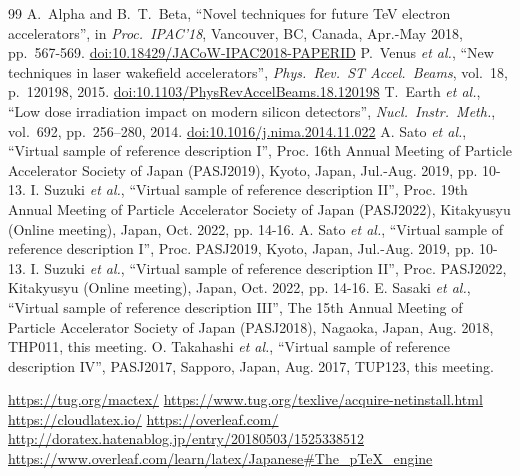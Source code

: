 \documentclass{PASJ2026}
\begin{document}
\begin{thebibliography}{99}
A.~Alpha and B.~T.~Beta, ``Novel techniques for future TeV electron accelerators'',
in \textit{Proc.\ IPAC'18}, 	Vancouver, BC, Canada, Apr.-May 2018,
pp.\ 567-569. %
\url{doi:10.18429/JACoW-IPAC2018-PAPERID}
P.~Venus \emph{et al.},
``New techniques in laser wakefield accelerators'',
\emph{Phys.\ Rev.\ ST Accel.\ Beams}, vol.\ 18,
p.\ 120198, 2015. %
\url{doi:10.1103/PhysRevAccelBeams.18.120198} 
T.~Earth \emph{et al.},
``Low dose irradiation impact on modern silicon detectors'',
\emph{Nucl.\ Instr.\ Meth.}, vol.\ 692, pp.\ 256--280, 2014.
\url{doi:10.1016/j.nima.2014.11.022}
A. Sato \emph{et al.}, ``Virtual sample of reference description I'', Proc. 16th Annual Meeting of Particle Accelerator Society of Japan (PASJ2019), Kyoto, Japan, Jul.-Aug. 2019, pp. 10-13.
I. Suzuki \emph{et al.}, ``Virtual sample of reference description II'', Proc. 19th Annual Meeting of Particle Accelerator Society of Japan (PASJ2022), Kitakyusyu (Online meeting), Japan, Oct. 2022, pp. 14-16.
A. Sato \emph{et al.}, ``Virtual sample of reference description I'', Proc. PASJ2019, Kyoto, Japan, Jul.-Aug. 2019, pp. 10-13.
I. Suzuki \emph{et al.}, ``Virtual sample of reference description II'', Proc. PASJ2022, Kitakyusyu (Online meeting), Japan, Oct. 2022, pp. 14-16.
E. Sasaki \emph{et al.}, ``Virtual sample of reference description III'', The 15th Annual Meeting of Particle Accelerator Society of Japan (PASJ2018), Nagaoka, Japan, Aug. 2018, THP011, this meeting.
O. Takahashi \emph{et al.}, ``Virtual sample of reference description IV'', PASJ2017, Sapporo, Japan, Aug. 2017, TUP123, this meeting.

\url{https://tug.org/mactex/}
\url{https://www.tug.org/texlive/acquire-netinstall.html}
\url{https://cloudlatex.io/}
\url{https://overleaf.com/}
\url{http://doratex.hatenablog.jp/entry/20180503/1525338512}\\
\url{https://www.overleaf.com/learn/latex/Japanese#The_pTeX_engine}
\end{thebibliography}
\end{document}
